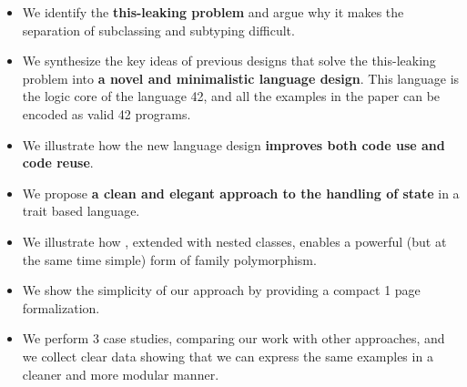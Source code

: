





\begin{itemize}
\item We identify the {\bf this-leaking problem} and argue why it
  makes the separation of subclassing and subtyping difficult.
\item We synthesize the key ideas of previous designs that solve the
  this-leaking problem into {\bf a novel and
  minimalistic language design}. This language is the logic core of the language 42, and 
  all the examples in the paper can be encoded as valid 42 programs. 

\item We illustrate how the new language design {\bf improves both code use and code
  reuse}.
\item We propose {\bf a clean and elegant approach to the handling of state} in a trait based language.

\item We illustrate how \name, extended with nested classes, enables a
  powerful (but at the same time simple) form of family polymorphism. %
\item We show the simplicity of our approach by providing a compact 1 page formalization.
\item We perform 3 case studies, comparing our work with other
  approaches, and we collect clear data showing that we can express the same examples in a cleaner and more modular manner.
\end{itemize}
\saveSpace
\saveSpace

